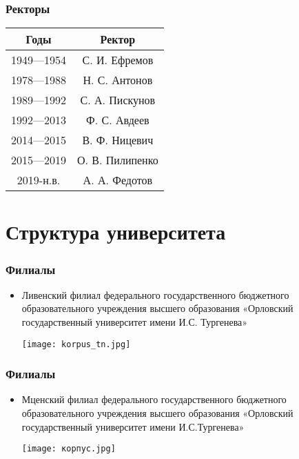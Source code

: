 \documentclass{beamer}
\begin{document}
\begin{frame}
\begin{center}
\frametitle{Ректоры}
\begin{tabular}{ |c|     c     | } 
 \hline
 Годы  & Ректор \\ 
 \hline
 1949—1954 & С. И. Ефремов \\
 \hline
 1978—1988 & Н. С. Антонов \\
 \hline
 1989—1992 & С. А. Пискунов \\
 \hline
 1992—2013 & Ф. С. Авдеев \\
 \hline
 2014—2015 & В. Ф. Ницевич \\
 \hline
 2015—2019 & О. В. Пилипенко \\
 \hline
 2019-н.в. & А. А. Федотов \\
 \hline
\end{tabular}
\end{center}
\section{Структура университета}

\end{frame}
\begin{frame}
\frametitle{Филиалы}
\begin{itemize}
  \item Ливенский филиал федерального государственного бюджетного образовательного учреждения высшего образования «Орловский государственный университет имени И.С. Тургенева»
  \centering
    \begin{minipage}{0.7\textwidth}
        \centering
  \texttt{[image: korpus\_tn.jpg]}
  \end{minipage}
\end{itemize}
\end{frame}

\begin{frame}
\frametitle{Филиалы}
\begin{itemize}
  \item Мценский филиал федерального государственного бюджетного
образовательного учреждения высшего образования «Орловский государственный университет имени И.С.Тургенева»
  \centering
    \begin{minipage}{0.7\textwidth}
        \centering
  \texttt{[image: корпус.jpg]}
  \end{minipage}
\end{itemize}
\end{frame}
\end{document}
